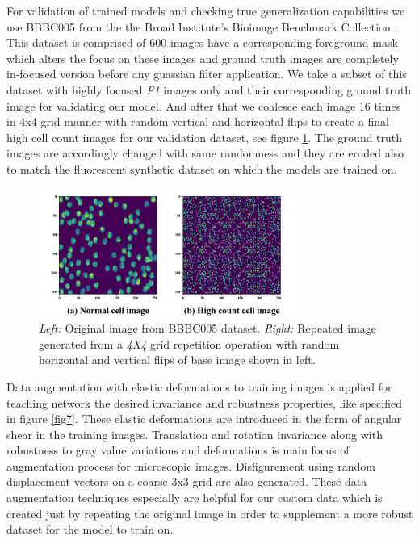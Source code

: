 \documentclass[runningheads]{llncs}
\begin{document}
For validation of trained models and checking true generalization capabilities we use BBBC005 from the the Broad Institute’s Bioimage Benchmark Collection \cite{b10}. This dataset is comprised of 600 images have a corresponding foreground mask which alters the focus on these images and ground truth images are completely in-focused version before any guassian filter application. We take a subset of this dataset with highly focused \textit{F1} images only and their corresponding ground truth image for validating our model. And after that we coalesce each image 16 times in 4x4 grid manner with random vertical and horizontal flips to create a final high cell count images for our validation dataset, see figure \ref{fig6}. The ground truth images are accordingly changed with same randomness and they are eroded also to match the fluorescent synthetic dataset on which the models are trained on.

\begin{figure}[!h]
\centering
\includegraphics[width=0.75\textwidth]{bbbc005cells-fig-compared.png}
\caption{\textit{Left: }Original image from BBBC005 dataset. \textit{Right: }Repeated image generated from a \textit{4X4} grid repetition operation with random horizontal and vertical flips of base image shown in left.}
\label{fig6}
\end{figure}

Data augmentation with elastic deformations to training images is applied for teaching network the desired invariance and robustness properties, like specified in figure \ref{fig7}. These elastic deformations are introduced in the form of angular shear in the training images. Translation and rotation invariance along with robustness to gray value variations and deformations is main focus of augmentation process for microscopic images. Disfigurement using random displacement vectors on a coarse 3x3 grid are also generated. These data augmentation techniques especially are helpful for our custom data which is created just by repeating the original image in order to supplement a more robust dataset for the model to train on.
\end{document}
